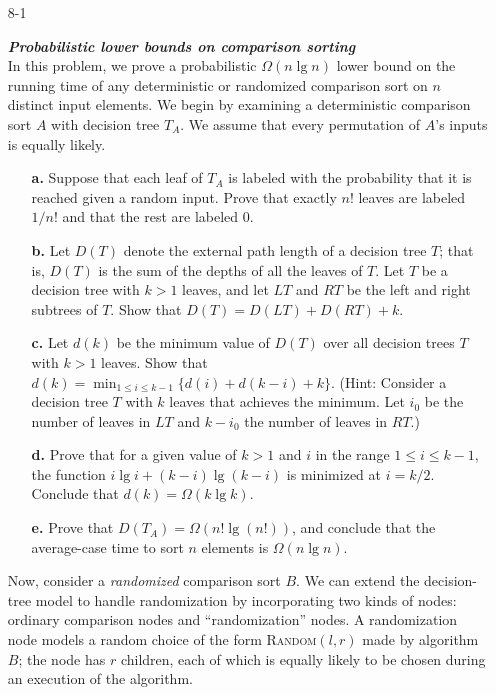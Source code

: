 \documentclass{report}
\begin{document}
\begin{enumerate}

\item[8-1]{\textbf{\emph{Probabilistic lower bounds on comparison sorting}}\\
In this problem, we prove a probabilistic $\Omega(n \lg n)$ lower bound on the
running time of any deterministic or randomized comparison sort on $n$ distinct
input elements. We begin by examining a deterministic comparison sort $A$ with
decision tree $T_A$. We assume that every permutation of $A$'s inputs is equally
likely.

\begin{enumerate}
\item[\textbf{a.}]{Suppose that each leaf of $T_A$ is labeled with the
probability that it is reached given a random input. Prove that exactly $n!$
leaves are labeled $1/n!$ and that the rest are labeled 0.}
\item[\textbf{b.}]{Let $D(T)$ denote the external path length of a decision tree
$T$; that is, $D(T)$ is the sum of the depths of all the leaves of $T$. Let $T$
be a decision tree with $k > 1$ leaves, and let $LT$ and $RT$ be the left and
right subtrees of $T$. Show that $D(T) = D(LT) + D(RT) + k$.}
\item[\textbf{c.}]{Let $d(k)$ be the minimum value of $D(T)$ over all decision
trees $T$ with $k > 1$ leaves. Show that
$d(k) = \min_{1 \le i \le k - 1} \{d(i) + d(k - i) + k\}$. (Hint: Consider
a decision tree $T$ with $k$ leaves that achieves the minimum. Let $i_0$ be the
number of leaves in $LT$ and $k - i_0$ the number of leaves in $RT$.)}
\item[\textbf{d.}]{Prove that for a given value of $k > 1$ and $i$ in the range
$1 \le i \le k - 1$, the function $i \lg i + (k - i) \lg (k - i)$ is minimized
at $i = k/2$. Conclude that $d(k) = \Omega(k \lg k)$.}
\item[\textbf{e.}]{Prove that $D(T_A) = \Omega(n! \lg(n!))$, and conclude that
the average-case time to sort $n$ elements is $\Omega(n \lg n)$.}
\end{enumerate}

Now, consider a \emph{randomized} comparison sort $B$. We can extend the
decision-tree model to handle randomization by incorporating two kinds of nodes:
ordinary comparison nodes and ``randomization'' nodes. A randomization node
models a random choice of the form \textsc{Random}$(l, r)$ made by algorithm
$B$; the node has $r$ children, each of which is equally likely to be chosen
during an execution of the algorithm.

}
\end{enumerate}
\end{document}
